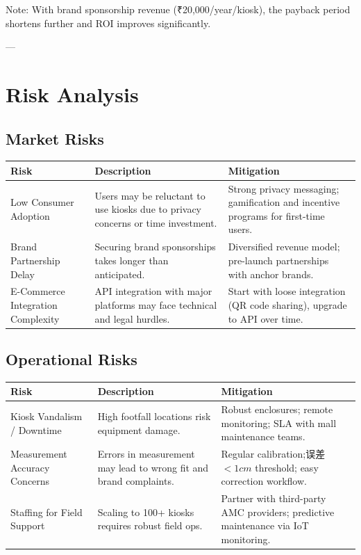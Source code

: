 \documentclass[12pt,a4paper]{article}
\begin{document}
Note: With brand sponsorship revenue (₹20,000/year/kiosk), the payback period shortens further and ROI improves significantly.

---

\section{Risk Analysis}

\subsection{Market Risks}

\begin{tabular}{lp{6cm}p{3cm}}
\toprule
Risk & Description & Mitigation \\
\midrule
Low Consumer Adoption & Users may be reluctant to use kiosks due to privacy concerns or time investment. & Strong privacy messaging; gamification and incentive programs for first-time users. \\
Brand Partnership Delay & Securing brand sponsorships takes longer than anticipated. & Diversified revenue model; pre-launch partnerships with anchor brands. \\
E-Commerce Integration Complexity & API integration with major platforms may face technical and legal hurdles. & Start with loose integration (QR code sharing), upgrade to API over time. \\
\midrule
\end{tabular}

\subsection{Operational Risks}

\begin{tabular}{lp{6cm}p{3cm}}
\toprule
Risk & Description & Mitigation \\
\midrule
Kiosk Vandalism / Downtime & High footfall locations risk equipment damage. & Robust enclosures; remote monitoring; SLA with mall maintenance teams. \\
Measurement Accuracy Concerns & Errors in measurement may lead to wrong fit and brand complaints. & Regular calibration;误差 $<1cm$ threshold; easy correction workflow. \\
Staffing for Field Support & Scaling to 100+ kiosks requires robust field ops. & Partner with third-party AMC providers; predictive maintenance via IoT monitoring. \\
\midrule
\end{tabular}
\end{document}
